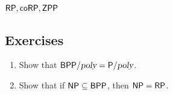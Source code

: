 \subsection{${\mathsf{RP}}, {\mathsf{coRP}}, {\mathsf{ZPP}}$}

\subsection*{Exercises}
\newcommand{\BPPpoly}{\BPP/\poly}
\begin{enumerate}
\item Show that $\BPPpoly = \Ppoly$. %
\item Show that if ${\mathsf{NP}} \subseteq {\ensuremath{\mathsf{BPP}}}$, then ${\mathsf{NP}} = {\mathsf{RP}}$. %
\end{enumerate}